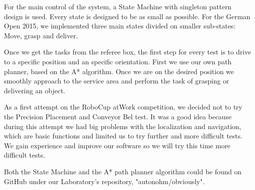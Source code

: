 For the main control of the system, a State Machine with singleton pattern design is used. Every state is designed to be as small as possible. For the German Open 2015, we implemented three main states divided on smaller sub-states: Move, grasp and deliver.

Once we get the tasks from the referee box, the first step for every test is to drive to a specific position and an specific orientation. First we use our own path planner, based on the A* algorithm. Once we are on the desired position we smoothly approach to the service area and perform the task of grasping or delivering an object. 

As a first attempt on the RoboCup atWork competition, we decided not to try the Precision Placement and Conveyor Bel test. It was a good idea because during this attempt we had big problems with the localization and navigation, which are basic functions and limited us to try further and more difficult tests. We gain experience and improve our software so we will try this time more difficult tests.

Both the State Machine and the A* path planner algorithm could be found on GitHub under our Laboratory's repository, "autonohm/obviously". 


